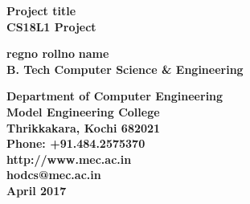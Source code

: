 \documentclass[11pt]{report}
\begin{document}
\renewcommand\bibname{References}
\pagestyle{fancy}
\fancyhead{}
\fancyfoot{}
\fancyfoot[c]{\thepage}
\renewcommand{\chaptermark}[1]{
\markboth{\thechapter.\ #1}{}} 
\renewcommand{\headrulewidth}{0.1pt}
\fancyhead[r]{\slshape \leftmark}
\addtolength{\headheight}{\baselineskip}
\addtolength{\headsep}{.1in}
\lhead{\nouppercase{\rightmark}}
\rhead{\nouppercase{\leftmark}}

\begin{titlepage}
\begin{center}

\Huge{\textbf{Project title}}\\
\vspace{0.05in}
\large{\textbf{CS18L1 Project\\}}
\vspace{1.2in}

\Large{\textbf{regno rollno}}	\hspace{.1in}	\Large{\textbf{name}}\\ 

\Large{\textbf{B. Tech Computer Science \& Engineering}}


\vspace{1.6in}
\begin{figure}[h]
\begin{center}
\end{center}
\end{figure}
\textbf{
Department of Computer Engineering\\
Model Engineering College\\
Thrikkakara, Kochi 682021\\
Phone: +91.484.2575370\\
http://www.mec.ac.in \\
hodcs@mec.ac.in\\
\vspace{0.9in}
{\upshape April 2017}
}
\end{center}
\end{titlepage}
\end{document}
